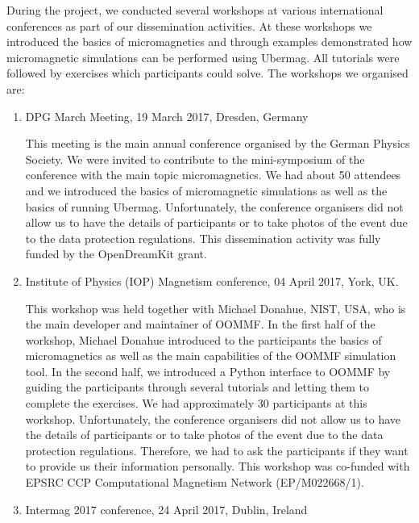 \documentclass{deliverablereport}
\begin{document}
During the project, we conducted several workshops at various
international conferences as part of our dissemination activities. At
these workshops we introduced the basics of micromagnetics and through
examples demonstrated how micromagnetic simulations can be performed
using Ubermag. All tutorials were followed by exercises which
participants could solve. The workshops we organised are:

\begin{enumerate}

\item DPG March Meeting, 19 March 2017, Dresden, Germany

  This meeting is the main annual conference organised by the German
  Physics Society. We were invited to contribute to the mini-symposium
  of the conference with the main topic micromagnetics. We had about
  50 attendees and we introduced the basics of micromagnetic
  simulations as well as the basics of running Ubermag. Unfortunately,
  the conference organisers did not allow us to have the details of
  participants or to take photos of the event due to the data
  protection regulations. This dissemination activity was fully funded
  by the OpenDreamKit grant.

\item Institute of Physics (IOP) Magnetism conference, 04 April 2017,
York, UK.

  This workshop was held together with Michael Donahue, NIST, USA, who
is the main developer and maintainer of OOMMF. In the first half of
the workshop, Michael Donahue introduced to the participants the
basics of micromagnetics as well as the main capabilities of the OOMMF
simulation tool. In the second half, we introduced a Python interface
to OOMMF by guiding the participants through several tutorials and
letting them to complete the exercises. We had approximately 30
participants at this workshop. Unfortunately, the conference
organisers did not allow us to have the details of participants or to
take photos of the event due to the data protection
regulations. Therefore, we had to ask the participants if they want to
provide us their information personally. This workshop was co-funded
with EPSRC CCP Computational Magnetism Network (EP/M022668/1).

\item Intermag 2017 conference, 24 April 2017, Dublin, Ireland


\end{enumerate}
\end{document}
